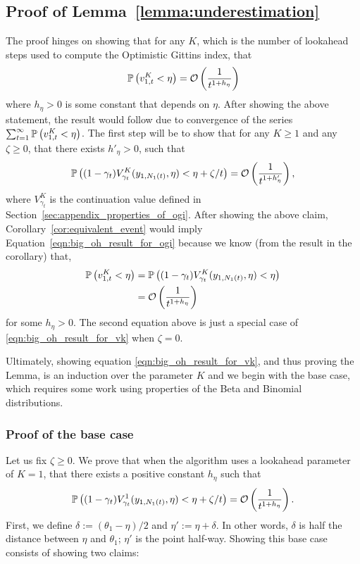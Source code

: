 \subsection{Proof of Lemma~\ref{lemma:underestimation}} \label{proof:underestimation_proof}
\begin{myproof}[Proof.]
	The proof hinges on showing that for any $K$, which is the number of lookahead steps used to compute the Optimistic Gittins index, that
	\begin{equation} \label{eqn:big_oh_result_for_ogi}
	\P{v^K_{1,t} < \eta} = \mathcal{O}\left(\frac{1}{t^{1 + h_\eta}}\right)
	\end{equation}
	where $h_\eta > 0$ is some constant that depends on $\eta$. After showing the above statement, the result would follow due to convergence of the series $\sum_{t=1}^\infty \P{v^K_{1,t} < \eta}$. The first step will be to show that for any $K \ge 1$ and any $\zeta \ge 0$, that there exists $h'_\eta > 0$, such that
	\begin{equation} \label{eqn:big_oh_result_for_vk}
		\P{(1-\gamma_t)V^K_{\gamma_t}(y_{1,N_1(t)}, \eta) < \eta + \zeta/t} = \mathcal{O}\left(\frac{1}{t^{1 + h'_\eta}}\right),
	\end{equation}
	where $V^K_{\gamma_t}$ is the continuation value defined in Section~\ref{sec:appendix_properties_of_ogi}. After showing the above claim, Corollary~\ref{cor:equivalent_event} would imply Equation~\eqref{eqn:big_oh_result_for_ogi} because we know (from the result in the corollary) that,
	\begin{align*}
		\P{v^K_{1,t} < \eta} & = \P{(1-\gamma_t)V^K_{\gamma_t}(y_{1,N_1(t)}, \eta) < \eta} \\
		& = \mathcal{O}\left(\frac{1}{t^{1 + h_\eta}}\right)
	\end{align*}
	for some $h_\eta > 0$. The second equation above is just a special case of \eqref{eqn:big_oh_result_for_vk} when $\zeta = 0$.
	
	Ultimately, showing equation \eqref{eqn:big_oh_result_for_vk}, and thus proving the Lemma, is an induction over the parameter $K$ and we begin with the base case, which requires some work using properties of the Beta and Binomial distributions.
	\subsubsection*{Proof of the base case}
	Let us fix $\zeta \ge 0$. We prove that when the algorithm uses a lookahead parameter of $K = 1$, that there exists a positive constant $h_\eta$ such that
	 \begin{equation} \label{eqn:base_case_lemma_underestimation}
	 \P{(1-\gamma_t)V^1_{\gamma_t}(y_{1,N_1(t)}, \eta) < \eta + \zeta/t} = \mathcal{O}\left(\frac{1}{t^{1 + h_\eta}}\right).
	 \end{equation}
	 First, we define $\delta := (\theta_1 - \eta)/2$ and  $\eta' :=  \eta + \delta$. In other words, $\delta$ is half the distance between $\eta$ and $\theta_1$; $\eta'$ is the point half-way. Showing this base case consists of showing two claims:

\end{myproof}
